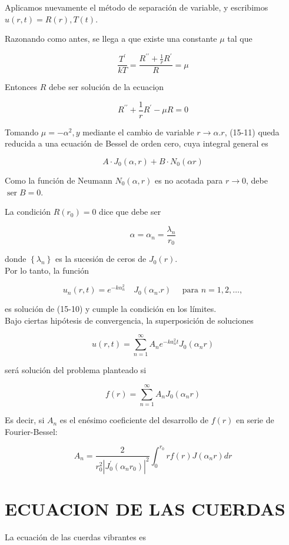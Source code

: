 \documentclass[10pt]{article}
\theoremstyle{plain}
\theoremstyle{definition}
\theoremstyle{remark}
\begin{document}
Aplicamos nuevamente el método de separación de variable, y escribimos $u(r, t)=R(r), T(t)$.

Razonando como antes, se llega a que existe una constante $\mu$ tal que

$$
\frac{T^{\prime}}{k T}=\frac{R^{\prime \prime}+\frac{1}{r} R^{\prime}}{R}=\mu
$$

Entonces $R$ debe ser solución de la ecuaciọn


\begin{equation*}
R^{\prime \prime}+\frac{1}{r} R^{\prime}-\mu R=0 \tag{$15\cdot11$}
\end{equation*}


Tomando $\mu=-\alpha^{2}, y$ mediante el cambio de variable $r \rightarrow \alpha . r$, (15-11) queda reducida a una ecuación de Bessel de orden cero, cuya integral general es

$$
A \cdot J_{0}(\alpha, r)+B \cdot N_{0}(\alpha r)
$$

Como la función de Neumann $N_{0}(\alpha, r)$ es no acotada para $r \rightarrow 0$, debe $\operatorname{ser} B=0$.

La condición $R\left(r_{0}\right)=0$ dice que debe ser

$$
\alpha=\alpha_{n}=\frac{\lambda_{n}}{r_{0}}
$$

donde $\left\{\lambda_{n}\right\}$ es la sucesión de ceros de $J_{0}(r)$.\\
Por lo tanto, la función

$$
u_{n}(r, t)=e^{-k \alpha_{n}^{2}} \quad J_{0}\left(\alpha_{n} . r\right) \quad \text { para } n=1,2, \ldots,
$$

es solución de (15-10) y cumple la condición en los límites.\\
Bajo ciertas hipótesis de convergencia, la superposición de soluciones

$$
u(r, t)=\sum_{n=1}^{\infty} A_{n} e^{-k a_{n}^{2} t} J_{0}\left(\alpha_{n} r\right)
$$

será solución del problema planteado si

$$
f(r)=\sum_{n=1}^{\infty} A_{n} J_{0}\left(\alpha_{n} r\right)
$$

Es decir, si $A_{n}$ es el enésimo coeficiente del desarrollo de $f(r)$ en serie de Fourier-Bessel:

$$
A_{n}=\frac{2}{r_{0}^{2}\left|J_{0}^{\prime}\left(\alpha_{n} r_{0}\right)\right|^{2}} \int_{0}^{r_{0}} r f(r) J\left(\alpha_{n} r\right) d r
$$

\section*{ECUACION DE LAS CUERDAS}
La ecuación de las cuerdas vibrantes es
\end{document}
